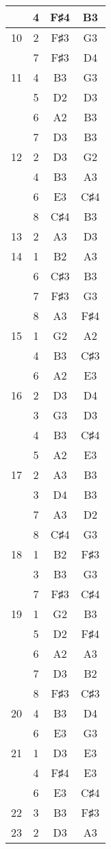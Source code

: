 \documentclass{article}
\begin{document}
\begin{longtable}{|c|c|c|c|}
  & 4 & F♯4 & B3 \\ 
\hline
10 & 2 & F♯3 & G3 \\ 
  & 7 & F♯3 & D4 \\ 
\hline
11 & 4 & B3 & G3 \\ 
  & 5 & D2 & D3 \\ 
  & 6 & A2 & B3 \\ 
  & 7 & D3 & B3 \\ 
\hline
12 & 2 & D3 & G2 \\ 
  & 4 & B3 & A3 \\ 
  & 6 & E3 & C♯4 \\ 
  & 8 & C♯4 & B3 \\ 
\hline
13 & 2 & A3 & D3 \\ 
\hline
14 & 1 & B2 & A3 \\ 
  & 6 & C♯3 & B3 \\ 
  & 7 & F♯3 & G3 \\ 
  & 8 & A3 & F♯4 \\ 
\hline
15 & 1 & G2 & A2 \\ 
  & 4 & B3 & C♯3 \\ 
  & 6 & A2 & E3 \\ 
\hline
16 & 2 & D3 & D4 \\ 
  & 3 & G3 & D3 \\ 
  & 4 & B3 & C♯4 \\ 
  & 5 & A2 & E3 \\ 
\hline
17 & 2 & A3 & B3 \\ 
  & 3 & D4 & B3 \\ 
  & 7 & A3 & D2 \\ 
  & 8 & C♯4 & G3 \\ 
\hline
18 & 1 & B2 & F♯3 \\ 
  & 3 & B3 & G3 \\ 
  & 7 & F♯3 & C♯4 \\ 
\hline
19 & 1 & G2 & B3 \\ 
  & 5 & D2 & F♯4 \\ 
  & 6 & A2 & A3 \\ 
  & 7 & D3 & B2 \\ 
  & 8 & F♯3 & C♯3 \\ 
\hline
20 & 4 & B3 & D4 \\ 
  & 6 & E3 & G3 \\ 
\hline
21 & 1 & D3 & E3 \\ 
  & 4 & F♯4 & E3 \\ 
  & 6 & E3 & C♯4 \\ 
\hline
22 & 3 & B3 & F♯3 \\ 
\hline
23 & 2 & D3 & A3 \\ 

\end{longtable}
\end{document}
